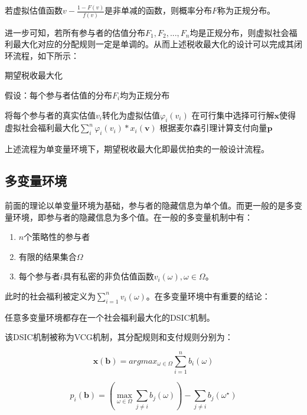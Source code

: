 \documentclass[promaster]{thesis-uestc}
\begin{document}
\begin{definition}[正规分布]
若虚拟估值函数$v-\frac{1-F(v)}{f(v)}$是非单减的函数，则概率分布$F$称为正规分布。 
\end{definition}

进一步可知，若所有参与者的估值分布$F_1,F_2,...,F_n$均是正规分布，则虚拟社会福利最大化对应的分配规则一定是单调的。从而上述税收最大化的设计可以完成其闭环流程，如下所示：

\begin{algorithm}[H]
\caption{期望税收最大化}
假设：每个参与者估值的分布$F_i$均为正规分布\;

将每个参与者的真实估值$v_i$转化为虚拟估值$\varphi_i(v_i)$\;
在可行集中选择可行解$\mathbf{x}$使得虚拟社会福利最大化$\sum_{i}^{n}{\varphi _i(v_i)*x_i(\mathbf{v})}$\;
根据麦尔森引理计算支付向量$\mathbf{p}$\;
\end{algorithm}

上述流程为单变量环境下，期望税收最大化即最优拍卖的一般设计流程。

\subsection{多变量环境}
前面的理论以单变量环境为基础，参与者的隐藏信息为单个值。而更一般的是多变量环境，即参与者的隐藏信息为多个值。在一般的多变量机制中有：

\begin{enumerate}
    \item $n$个策略性的参与者
    \item 有限的结果集合$\Omega$
    \item 每个参与者$i$具有私密的非负估值函数$v_i(\omega),\omega \in \Omega$。
\end{enumerate}

此时的社会福利被定义为$\sum_{i=1}^{n}{v_i(\omega)}$。在多变量环境中有重要的结论：

\begin{theorem}
    任意多变量环境都存在一个社会福利最大化的DSIC机制。
\end{theorem}

该DSIC机制被称为VCG机制，其分配规则和支付规则分别为：

\begin{equation}
 \mathbf{x}(\mathbf{b})=argmax_{\omega \in \Omega}\sum_{i=1}^{n}{b_i(\omega)}
\end{equation}

\begin{equation}
p_i(\mathbf{b})=\left(\max_{\omega\in\Omega}\sum_{j\neq i}{b_j(\omega)}\right)-\sum_{j\neq i}b_j(\omega^\star)    
\end{equation}
\end{document}
